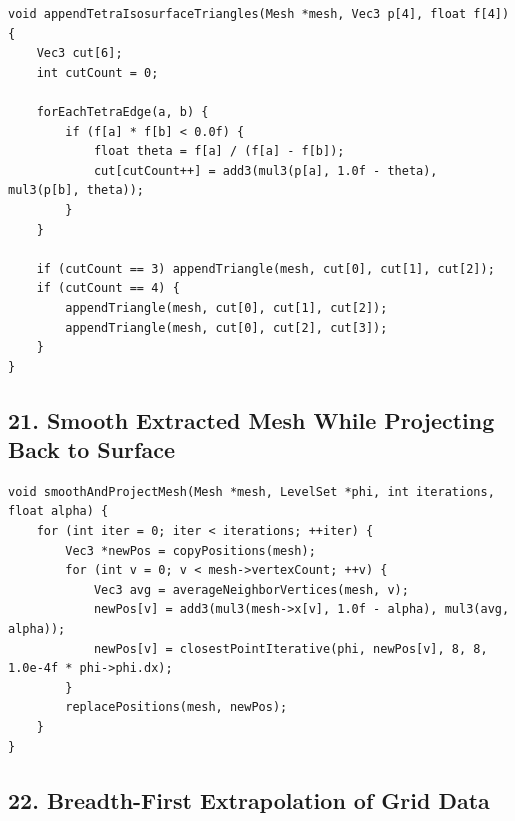 \documentclass[10pt,letterpaper]{article}
\begin{document}
\begin{verbatim}
void appendTetraIsosurfaceTriangles(Mesh *mesh, Vec3 p[4], float f[4]) {
    Vec3 cut[6];
    int cutCount = 0;

    forEachTetraEdge(a, b) {
        if (f[a] * f[b] < 0.0f) {
            float theta = f[a] / (f[a] - f[b]);
            cut[cutCount++] = add3(mul3(p[a], 1.0f - theta), mul3(p[b], theta));
        }
    }

    if (cutCount == 3) appendTriangle(mesh, cut[0], cut[1], cut[2]);
    if (cutCount == 4) {
        appendTriangle(mesh, cut[0], cut[1], cut[2]);
        appendTriangle(mesh, cut[0], cut[2], cut[3]);
    }
}
\end{verbatim}

\subsection*{21. Smooth Extracted Mesh While Projecting Back to Surface}

\begin{verbatim}
void smoothAndProjectMesh(Mesh *mesh, LevelSet *phi, int iterations, float alpha) {
    for (int iter = 0; iter < iterations; ++iter) {
        Vec3 *newPos = copyPositions(mesh);
        for (int v = 0; v < mesh->vertexCount; ++v) {
            Vec3 avg = averageNeighborVertices(mesh, v);
            newPos[v] = add3(mul3(mesh->x[v], 1.0f - alpha), mul3(avg, alpha));
            newPos[v] = closestPointIterative(phi, newPos[v], 8, 8, 1.0e-4f * phi->phi.dx);
        }
        replacePositions(mesh, newPos);
    }
}
\end{verbatim}

\subsection*{22. Breadth-First Extrapolation of Grid Data}
\end{document}
